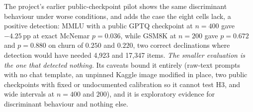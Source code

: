 The project's earlier public-checkpoint pilot shows the same discriminant
behaviour under worse conditions, and adds the case the eight cells lack, a
positive detection: MMLU with a public GPTQ checkpoint at $n = 400$ gave
$-4.25$\,pp at exact McNemar $p = 0.036$, while GSM8K at $n = 200$ gave
$p = 0.672$ and $p = 0.880$ on churn of $0.250$ and $0.220$, two correct
declinations where detection would have needed 4{,}923 and 17{,}347 items.
\emph{The smaller evaluation is the one that detected nothing.} Its caveats
bound it entirely (raw-text prompts with no chat template, an unpinned Kaggle
image modified in place, two public checkpoints with fixed or undocumented
calibration so it cannot test H3, and wide intervals at $n = 400$ and $200$),
and it is exploratory evidence for discriminant behaviour and nothing else.
